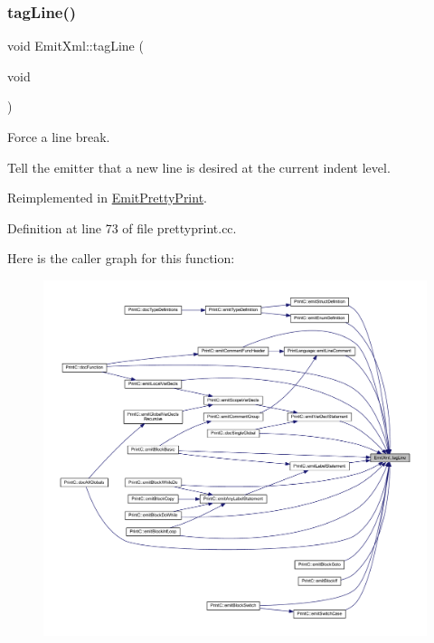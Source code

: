 \subsubsection{\texorpdfstring{tagLine()}{tagLine()}\hspace{0.1cm}{\footnotesize\ttfamily [1/2]}}
{\footnotesize\ttfamily void Emit\+Xml\+::tag\+Line (\begin{DoxyParamCaption}\item[{void}]{ }\end{DoxyParamCaption})\hspace{0.3cm}{\ttfamily [virtual]}}



Force a line break. 

Tell the emitter that a new line is desired at the current indent level. 

Reimplemented in \mbox{\hyperlink{class_emit_pretty_print_a986da682a9a028e8cf7ee8162f941014}{Emit\+Pretty\+Print}}.



Definition at line 73 of file prettyprint.\+cc.

Here is the caller graph for this function\+:
\nopagebreak
\begin{figure}[H]
\begin{center}
\leavevmode
\includegraphics[width=350pt]{class_emit_xml_a2c98eede26b667575347382df89ab310_icgraph}
\end{center}
\end{figure}
\mbox{\label{class_emit_xml_afb2b27a85e75136cf66d143d2dd502ae}} 

